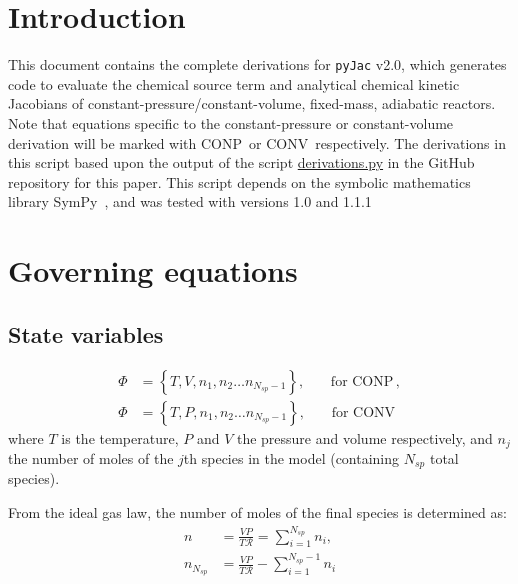 \documentclass[12pt]{article}
\newcommand{\ns}{\ensuremath{{N_{sp}}}}
\newcommand{\conp}{CONP}
\newcommand{\conv}{CONV}
\newcommand{\dconp}{\ensuremath{,\qquad\text{for \conp}}}
\newcommand{\dconv}{\ensuremath{,\qquad\text{for \conv}}}
\newcommand{\Ru}{\ensuremath{\mathcal{R}}}
\begin{document}
\section{Introduction}
This document contains the complete derivations for \texttt{pyJac} v2.0, which generates code to evaluate the chemical source term and analytical chemical kinetic Jacobians of constant-pressure\slash constant-volume, fixed-mass, adiabatic reactors.
Note that equations specific to the constant-pressure or constant-volume derivation will be marked with \conp~or \conv~respectively.
The derivations in this script based upon the output of the script \href{https://github.com/arghdos/SPyJac-paper/blob/master/derivations/scripts/derivations.py}{derivations.py} in the GitHub repository for this paper.
This script depends on the symbolic mathematics library SymPy~\cite{sympy}, and was tested with versions 1.0 and 1.1.1

\section{Governing equations}
\subsection{State variables}

\begin{subequations}
\begin{align}
\Phi &= \left\{T, V, n_1, n_2 \ldots n_{\ns - 1}\right\}\dconp, \\
\Phi &= \left\{T, P, n_1, n_2 \ldots n_{\ns - 1}\right\}\dconv
\end{align}
\end{subequations}
where $T$ is the temperature, $P$ and $V$ the pressure and volume respectively, and $n_j$ the number of moles of the $j$th species in the model (containing $\ns$ total species).

From the ideal gas law, the number of moles of the final species is determined as:
\begin{subequations}
\begin{align}
n &= \frac{V P}{T \Ru} = \sum_{i=1}^{\ns}{n_i}, \label{e:source_moles}\\
n_{\ns} &= \frac{V P}{T \Ru} - \sum_{i=1}^{\ns - 1}{n_i}
\end{align}
\end{subequations}
\end{document}
